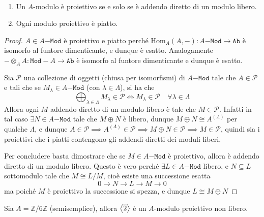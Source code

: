\begin{corollary}{} \(\) 
\begin{enumerate}[label = \arabic*.]
    \item Un \(A\)-modulo è proiettivo se e solo se è addendo diretto di un
        modulo libero.
    \item Ogni modulo proiettivo è piatto.
\end{enumerate}
\end{corollary}
\begin{proof}{}
    \(A \in A\mathtt{-Mod}\) è proiettivo e piatto perché \(\mathrm{Hom}_A {(A,
    -)} : A\mathtt{-Mod} \to \mathtt{Ab}\) è isomorfo al funtore dimenticante, e
    dunque è esatto. Analogamente \(- \otimes_A A : \mathtt{Mod-}A \to
    \mathtt{Ab}\) è isomorfo al funtore dimenticante e dunque è esatto.

    Sia \(\mathcal{P}\) una collezione di oggetti (chiusa per isomorfismi) di
    \(A\mathtt{-Mod}\) tale che \(A \in \mathcal{P}\) e tali che se \(M_\lambda
    \in A\mathtt{-Mod}\) (con \(\lambda \in \Lambda\)), si ha che 
    \[
      \bigoplus_{\lambda \in \Lambda} M_\lambda \in \mathcal{P} \iff M_\lambda
      \in \mathcal{P} \quad \forall \lambda \in \Lambda
    \]
    Allora ogni \(M\) addendo diretto di un modulo libero è tale che \(M \in
    \mathcal{P}\). Infatti in tal caso \(\exists N \in A\mathtt{-Mod}\) tale che
    \(M \oplus N\) è libero, dunque \(M \oplus N \cong A^{{(\Lambda)}}\) per
    qualche \(\Lambda\), e dunque \(A \in \mathcal{P} \implies A^{{(\Lambda)}}
    \in \mathcal{P} \implies M \oplus N \in \mathcal{P} \implies  M \in
    \mathcal{P}\), quindi sia i proiettivi che i piatti contengono gli addendi
    diretti dei moduli liberi.

    Per concludere basta dimostrare che se \(M \in A\mathtt{-Mod}\) è
    proiettivo, allora è addendo diretto di un modulo libero. Questo è vero
    perché \(\exists L \in A\mathtt{-Mod}\) libero, e \(N \subseteq L \)
    sottomodulo tale che \(M \cong L/M\), cioè esiste una successione esatta
    \[
      0 \to N \to L \to M \to 0
    \]
    ma poiché \(M\) è proiettivo la successione si spezza, e dunque \(L \cong M
    \oplus N\) 
\end{proof}

\begin{example}{}
    Sia \(A = \mathbb{Z} / 6 \mathbb{Z}\) (semisemplice), allora
    \({\left\langle\overline{2}\right\rangle} \) è un \(A\)-modulo proiettivo non libero.
\end{example}

